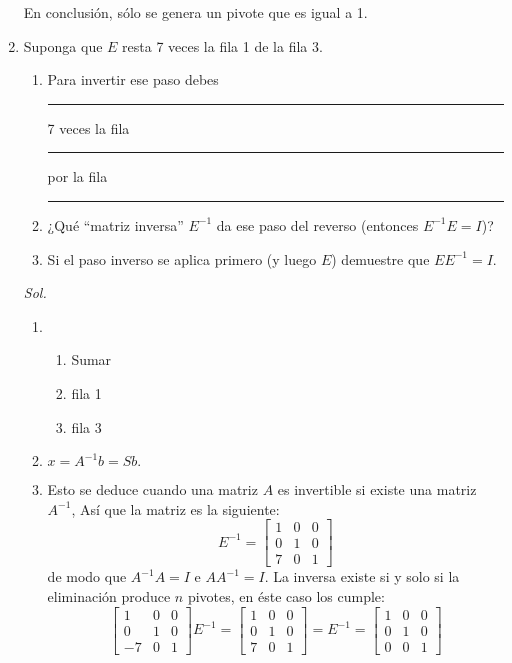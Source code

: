 \begin{enumerate}
	      En conclusión, sólo se genera un pivote que es igual a 1.


	\item Suponga que $E$ resta 7 veces la fila 1 de la fila 3.

	      \begin{enumerate}
		      \item Para invertir ese paso debes \rule{10mm}{0.1mm} 7 veces la fila \rule {10mm}{0.1mm} por la fila \rule{10mm}{0.1mm}
		      \item  ¿Qué ``matriz inversa'' $E^{-1}$ da ese paso del reverso (entonces $E^{-1}E = I$)?
		      \item  Si el paso inverso se aplica primero (y luego $E$) demuestre que $E E^{-1} = I$.
	      \end{enumerate}
	      \textit{ Sol. }
	      \begin{enumerate}
		      \item
		            \begin{enumerate}
			            \item Sumar
			            \item fila 1
			            \item fila 3
		            \end{enumerate}
		      \item $x = A^{-1}b = Sb. $
		      \item Esto se deduce cuando una matriz $A$ es invertible si existe una matriz $A^{-1}$, Así que la matriz es la siguiente:
		            \begin{equation*}
			            E^{-1}=\begin{bmatrix}
				            1 & 0 & 0 \\ 0& 1 &0\\ 7 &0 &1
			            \end{bmatrix}
		            \end{equation*}
		            de modo que $A^{-1}A=I$ e $AA^{-1}=I$. La inversa existe si y solo si la eliminación produce $n$ pivotes, en éste caso los cumple:
		            \begin{equation*}
			            \begin{bmatrix}
				            1 & 0 & 0 \\ 0& 1 &0\\ -7 &0 &1
			            \end{bmatrix}E^{-1}=\begin{bmatrix}
				            1 & 0 & 0 \\ 0& 1 &0\\ 7 &0 &1
			            \end{bmatrix}=E^{-1}=\begin{bmatrix}
				            1 & 0 & 0 \\ 0& 1 &0\\ 0&0 &1
			            \end{bmatrix}
		            \end{equation*}
	      \end{enumerate}



\end{enumerate}

